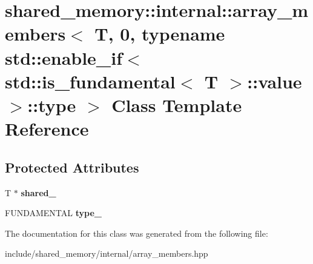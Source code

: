 \hypertarget{classshared__memory_1_1internal_1_1array__members_3_01T_00_010_00_01typename_01std_1_1enable__ifb2fde5f96702510d664610c5e9570772}{}\section{shared\+\_\+memory\+:\+:internal\+:\+:array\+\_\+members$<$ T, 0, typename std\+:\+:enable\+\_\+if$<$ std\+:\+:is\+\_\+fundamental$<$ T $>$\+:\+:value $>$\+:\+:type $>$ Class Template Reference}
\label{classshared__memory_1_1internal_1_1array__members_3_01T_00_010_00_01typename_01std_1_1enable__ifb2fde5f96702510d664610c5e9570772}
\subsection*{Protected Attributes}
\begin{DoxyCompactItemize}
\item 
\mbox{\label{classshared__memory_1_1internal_1_1array__members_3_01T_00_010_00_01typename_01std_1_1enable__ifb2fde5f96702510d664610c5e9570772_af2e2d48d60bf0b97ad542183007fc4e9}} 
T $\ast$ {\bfseries shared\+\_\+}
\item 
\mbox{\label{classshared__memory_1_1internal_1_1array__members_3_01T_00_010_00_01typename_01std_1_1enable__ifb2fde5f96702510d664610c5e9570772_a2c26512ea8a02432f5f157e8c4ef7fa9}} 
F\+U\+N\+D\+A\+M\+E\+N\+T\+AL {\bfseries type\+\_\+}
\end{DoxyCompactItemize}


The documentation for this class was generated from the following file\+:\begin{DoxyCompactItemize}
\item 
include/shared\+\_\+memory/internal/array\+\_\+members.\+hpp\end{DoxyCompactItemize}
